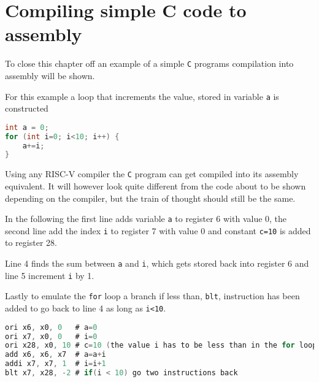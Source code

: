     \section{Compiling simple C code to assembly}
        To close this chapter off an example of a simple \texttt{C} programs compilation into assembly will be shown.
        
        For this example a loop that increments the value, stored in variable \texttt{a} is constructed
        \begin{lstlisting}[language=C]
int a = 0;
for (int i=0; i<10; i++) {
    a+=i;
}
        \end{lstlisting}
        Using any RISC-V compiler the \texttt{C} program can get compiled into its assembly equivalent. It will however look quite different from the code about to be shown depending on the compiler, but the train of thought should still be the same.
        
        In the following the first line adds variable \texttt{a} to register 6 with value 0, the second line add the index \texttt{i} to register 7 with value 0 and constant \texttt{c=10} is added to register 28. 
        
        Line 4 finds the sum between \texttt{a} and \texttt{i}, which gets stored back into register 6 and line 5 increment \texttt{i} by 1.
        
        Lastly to emulate the \texttt{for} loop a branch if less than, \texttt{blt}, instruction has been added to go back to line 4 as long as \texttt{i<10}.
        \begin{lstlisting}[language=C]
ori x6, x0, 0   # a=0
ori x7, x0, 0   # i=0
ori x28, x0, 10 # c=10 (the value i has to be less than in the for loop)
add x6, x6, x7  # a=a+i
addi x7, x7, 1  # i=i+1
blt x7, x28, -2 # if(i < 10) go two instructions back
        \end{lstlisting}
        
        
